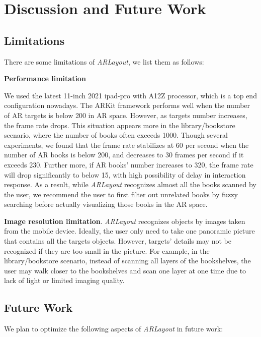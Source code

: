 \section{Discussion and Future Work}
\label{sec:discussion}



\subsection{Limitations}
There are some limitations of \textit{ARLayout},
we list them as follows:




\textbf{Performance limitation}

We used the latest 11-inch 2021 ipad-pro with A12Z processor, which is a top end configuration nowadays.
The ARKit framework performs well when the number of AR targets is below 200 in AR space.
However, as targets number increases, the frame rate drops.
This situation appears more in the library/bookstore scenario, where the number of books often exceeds 1000.
Though several experiments, we found that the frame rate stabilizes at 60 per second
when the number of AR books is below 200, and decreases to 30 frames per second
if it exceeds 230. Further more, if AR books' number increases to 320, the frame rate
will drop significantly to below 15, with high possibility of delay in interaction response.
As a result, while \textit{ARLayout} recognizes almost all the books scanned by the user,
we recommend the user to first filter out unrelated books by fuzzy searching before actually
visualizing those books in the AR space.

\textbf{Image resolution limitation}. \textit{ARLayout} recognizes objects by images taken from the mobile device.
Ideally, the user only need to take one panoramic picture that contains all the targets objects.
However, targets' details may not be recognized if they are too small in the picture.
For example, in the library/bookstore scenario, instead of scanning all layers of the bookshelves,
the user may walk closer to the bookshelves and scan one layer at one time
due to lack of light or limited imaging quality.


\subsection{Future Work}
We plan to optimize the following aspects of \textit{ARLayout} in future work:

